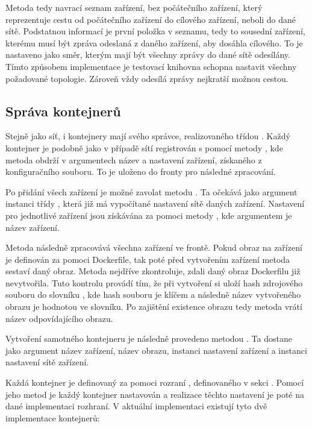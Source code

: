 Metoda tedy navrací seznam zařízení, bez počátečního zařízení, který reprezentuje cestu od počátečního zařízení do cílového zařízení, neboli do dané sítě. Podstatnou informací je první položka v seznamu, tedy to sousední zařízení, kterému musí být zpráva odeslaná z daného zařízení, aby dosáhla cílového. To je nastaveno jako směr, kterým mají být všechny zprávy do dané sítě odesílány. Tímto způsobem implementace je testovací knihovna schopna nastavit všechny požadované topologie. Zároveň vždy odesílá zprávy nejkratší možnou cestou.

\subsection{Správa kontejnerů}\label{sec:cont_managment}

Stejně jako síť, i kontejnery mají svého správce, realizovaného třídou . Každý kontejner je podobně jako v případě sítí registrován s pomocí metody , kde metoda obdrží v argumentech název a nastavení zařízení, získaného z konfiguračního souboru. To je uloženo do fronty pro následné zpracování.

Po přidání všech zařízení je možné zavolat metodu . Ta očekává jako argument instanci třídy , která již má vypočítané nastavení sítě daných zařízení. Nastavení pro jednotlivé zařízení jsou získávána za pomoci metody , kde argumentem je název zařízení. 

Metoda  následně zpracovává všechna zařízení ve frontě. Pokud obraz na zařízení je definován za pomoci Dockerfile, tak poté před vytvořením zařízení metoda  sestaví daný obraz. Metoda nejdříve zkontroluje, zdali daný obraz Dockerfilu již nevytvořila. Tuto kontrolu provádí tím, že při vytvoření si uloží hash zdrojového souboru do slovníku , kde hash souboru je klíčem a následně název vytvořeného obrazu je hodnotou ve slovníku. Po zajištění existence obrazu tedy metoda  vrátí název odpovídajícího obrazu. 

Vytvoření samotného kontejneru je následně provedeno metodou . Ta dostane jako argument název zařízení, název obrazu, instanci nastavení zařízení a instanci nastavení sítě zařízení. 

Každá kontejner je definovaný za pomoci rozraní , definovaného v sekci \label{sec:cont_design}. Pomocí jeho metod je každý kontejner nastavován a realizace těchto nastavení je poté na dané implementaci rozhraní. V aktuální implementaci existují tyto dvě implementace kontejnerů: 

